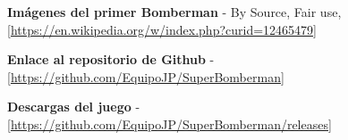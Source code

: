 \documentclass[a4paper]{article}
\begin{document}
\begin{thebibliography}{99}
	 \textbf{Imágenes del primer Bomberman} - By Source, Fair use, [\url{https://en.wikipedia.org/w/index.php?curid=12465479}]
	
	\bibitem{} \textbf{Enlace al repositorio de Github} - [\url{https://github.com/EquipoJP/SuperBomberman}]
	
	\bibitem{} \textbf{Descargas del juego} - [\url{https://github.com/EquipoJP/SuperBomberman/releases}]
\end{thebibliography}
\end{document}
